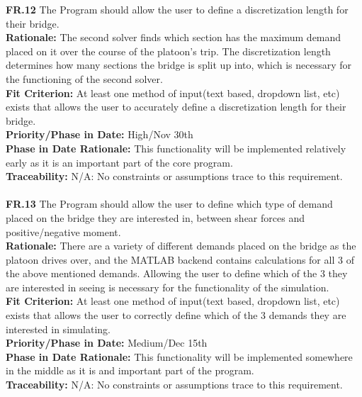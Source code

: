\documentclass[12pt]{article}
\begin{document}
  \noindent\textbf{FR.12} The Program should allow the user to define a discretization length for their bridge.\\
  \textbf{Rationale:} The second solver finds which section has the maximum demand placed on it over the course of the platoon's trip. The discretization length determines how
  many sections the bridge is split up into, which is necessary for the functioning of the second solver.\\
  \textbf{Fit Criterion:} At least one method of input(text based, dropdown list, etc) exists that allows the user to accurately define a discretization length for their bridge.\\
  \textbf{Priority/Phase in Date:} High/Nov 30th\\
  \textbf{Phase in Date Rationale:} This functionality will be implemented relatively early as it is an important part of the core program.\\
  \textbf{Traceability:} N/A: No constraints or assumptions trace to this requirement.\\\\

  \noindent\textbf{FR.13} The Program should allow the user to define which type of demand placed on the bridge they are interested in, between shear forces and positive/negative moment.\\
  \textbf{Rationale:} There are a variety of different demands placed on the bridge as the platoon drives over, and the MATLAB backend contains calculations for all 3 of the
  above mentioned demands. Allowing the user to define which of the 3 they are interested in seeing is necessary for the functionality of the simulation.\\
  \textbf{Fit Criterion:} At least one method of input(text based, dropdown list, etc) exists that allows the user to correctly define which of the 3 demands they are interested in
  simulating.\\
  \textbf{Priority/Phase in Date:} Medium/Dec 15th\\
  \textbf{Phase in Date Rationale:} This functionality will be implemented somewhere in the middle as it is and important part of the program.\\
  \textbf{Traceability:} N/A: No constraints or assumptions trace to this requirement.\\\\
\end{document}

